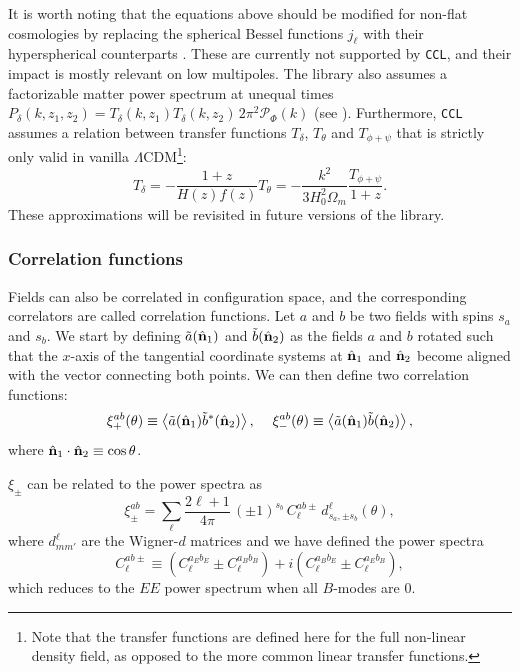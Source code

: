 \documentclass[\docopts]{\docclass}
\newcommand{\nv}{\hat{\bf n}}
\newcommand{\ccl}{{\tt CCL}\xspace}
\begin{document}
\noindent
It is worth noting that the equations above should be modified for non-flat cosmologies by replacing the spherical Bessel functions $j_\ell$ with their hyperspherical counterparts \citep{1994ApJ...432....7K}. These are currently not supported by \ccl, and their impact is mostly relevant on low multipoles. The library also assumes a factorizable matter power spectrum at unequal times $P_\delta(k,z_1,z_2)=T_\delta(k,z_1)T_\delta(k,z_2)\,2\pi^2\mathcal{P}_\Phi(k)$ (see \citealt{2017PhRvD..95f3522K}). Furthermore, \ccl assumes a relation between transfer functions $T_\delta$, $T_\theta$ and $T_{\phi+\psi}$ that is strictly only valid in vanilla $\Lambda$CDM\footnote{Note that the transfer functions are defined here for the full non-linear density field, as opposed to the more common linear transfer functions.}:
\begin{equation}
  T_\delta=-\frac{1+z}{H(z)f(z)}T_\theta=-\frac{k^2}{3H_0^2\Omega_m}\frac{T_{\phi+\psi}}{1+z}.
\end{equation}
These approximations will be revisited in future versions of the library.


\subsubsection{Correlation functions}

Fields can also be correlated in configuration space, and the corresponding correlators are called correlation functions. Let $a$ and $b$ be two fields with spins $s_a$ and $s_b$. We start by defining $\tilde{a}(\nv_1)$ and $\tilde{b}(\nv_2)$ as the fields $a$ and $b$ rotated such that the $x$-axis of the tangential coordinate systems at $\nv_1$ and $\nv_2$ become aligned with the vector connecting both points. We can then define two correlation functions:
\begin{equation}\nonumber
  \xi^{ab}_+(\theta)\equiv\left\langle\tilde{a}(\nv_1)\tilde{b}^*(\nv_2)\right\rangle,\hspace{12pt}
  \xi^{ab}_-(\theta)\equiv\left\langle\tilde{a}(\nv_1)\tilde{b}(\nv_2)\right\rangle,
  \label{eq:xipm}
\end{equation}
where $\nv_1\cdot\nv_2\equiv\cos\theta$. 

$\xi_{\pm}$ can be related to the power spectra as
\begin{equation}\label{eq:cl_xi}
 \xi^{ab}_\pm = \sum_\ell\frac{2\ell+1}{4\pi}\,(\pm1)^{s_b}\,C^{ab\pm}_\ell\,d^\ell_{s_a,\pm s_b}(\theta),
\end{equation}
where $d^\ell_{mm'}$ are the Wigner-$d$ matrices \citep{Ng1999,2004MNRAS.350..914C} and we have defined the power spectra
\begin{equation}
  C^{ab\pm}_\ell\equiv\left(C^{a_Eb_E}_\ell\pm C^{a_Bb_B}_\ell\right)+i\left(C^{a_Bb_E}_\ell\pm C^{a_Eb_B}_\ell\right),
\end{equation}
which reduces to the $EE$ power spectrum when all $B$-modes are 0.
\end{document}
